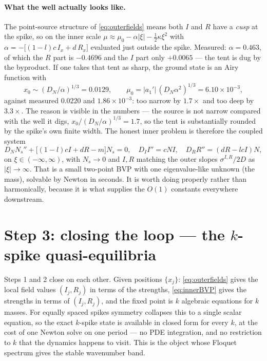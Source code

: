 \documentclass[11pt,a4paper]{article}
\newcommand{\Ns}{N_{s}}
\newcommand{\xj}{x_j}
\theoremstyle{plain}
\theoremstyle{remark}
\begin{document}
\paragraph{What the well actually looks like.} The point-source structure of
\eqref{eq:outerfields} means both $I$ and $R$ have a \emph{cusp} at the spike,
so on the inner scale $\mu \approx \mu_0 - \alpha|\xi| - \tfrac12\kappa\xi^2$
with $\alpha = -\big[(1-l)c\,I_x + d\,R_x\big]$ evaluated just outside the
spike. Measured: $\alpha = 0.463$, of which the $R$ part is $-0.4696$ and the
$I$ part only $+0.0065$ --- the tent is dug by the byproduct. If one takes that
tent as sharp, the ground state is an Airy function with
\begin{equation}
  x_0 \sim (D_N/\alpha)^{1/3} = 0.0129, \qquad
  \mu_0 = |a_1'|\,(D_N\alpha^2)^{1/3} = 6.10\times10^{-3},
\end{equation}
against measured $0.0220$ and $1.86\times10^{-3}$: too narrow by $1.7\times$ and
too deep by $3.3\times$. The reason is visible in the numbers --- the source is
not narrow compared with the well it digs, $x_0/(D_N/\alpha)^{1/3} = 1.7$, so
the tent is substantially rounded by the spike's own finite width. The honest
inner problem is therefore the coupled system
\begin{equation}
  D_N \Ns'' + \big[(1-l)cI + dR - m\big]\Ns = 0, \quad
  D_I I'' = cN I, \quad
  D_R R'' = (dR - lcI)N,
\label{eq:innerBVP}
\end{equation}
on $\xi \in (-\infty,\infty)$, with $\Ns \to 0$ and $I,R$ matching the outer
slopes $\sigma^{I,R}/2D$ as $|\xi|\to\infty$. That is a small two-point BVP with
one eigenvalue-like unknown (the mass), solvable by Newton in seconds. It is
worth doing properly rather than harmonically, because it is what supplies the
$O(1)$ constants everywhere downstream.

\section{Step 3: closing the loop --- the $k$-spike quasi-equilibria}

Steps 1 and 2 close on each other. Given positions $\{\xj\}$:
\eqref{eq:outerfields} gives the local field values $(I_j, R_j)$ in terms of the
strengths, \eqref{eq:innerBVP} gives the strengths in terms of $(I_j, R_j)$, and
the fixed point is $k$ algebraic equations for $k$ masses. For equally spaced
spikes symmetry collapses this to a single scalar equation, so the exact
$k$-spike state is available in closed form for every $k$, at the cost of one
Newton solve on one period --- no PDE integration, and no restriction to $k$
that the dynamics happens to visit. This is the object whose Floquet spectrum
gives the stable wavenumber band.
\end{document}

